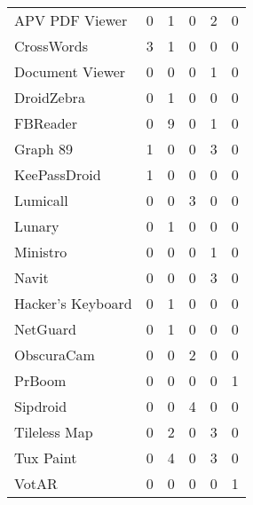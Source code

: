 \begin{table}[t]
\begin{tabular}{l||r|r|r|r|r}
    APV PDF Viewer    & 0 & 1 & 0 & \cellcolor{\succcolor}2 & 0 \\ 
    CrossWords        & \cellcolor{\succcolor}3 & 1 & 0 & 0 & 0 \\ 
    Document Viewer   & 0 & 0 & 0 & \cellcolor{\succcolor}1 & 0 \\ 
    DroidZebra        & 0 & 1 & 0 & 0 & 0 \\ 
    FBReader          & 0 & 9 & 0 & \cellcolor{\succcolor}1 & 0 \\ 
    Graph 89          & \cellcolor{\succcolor}1 & 0 & 0 & \cellcolor{\succcolor}3 & 0 \\ 
    KeePassDroid      & \cellcolor{\succcolor}1 & 0 & 0 & 0 & 0 \\
    Lumicall          & 0 & 0 & \cellcolor{\succcolor}3 & 0 & 0 \\ 
    Lunary            & 0 & 1 & 0 & 0 & 0 \\
    Ministro          & 0 & 0 & 0 & \cellcolor{\succcolor}1 & 0 \\ 
    Navit             & 0 & 0 & 0 & \cellcolor{\succcolor}3 & 0 \\ 
    Hacker's Keyboard & 0 & 1 & 0 & 0 & 0 \\ 
    NetGuard          & 0 & 1 & 0 & 0 & 0 \\ 
    ObscuraCam        & 0 & 0 & \cellcolor{\succcolor}2 & 0 & 0 \\ 
    PrBoom            & 0 & 0 & 0 & 0 & \cellcolor{\succcolor}1 \\
    Sipdroid          & 0 & 0 & \cellcolor{\succcolor}4 & 0 & 0 \\ 
    Tileless Map      & 0 & 2 & 0 & \cellcolor{\succcolor}3 & 0 \\ 
    Tux Paint         & 0 & 4 & 0 & \cellcolor{\succcolor}3 & 0 \\ 
    VotAR             & 0 & 0 & 0 & 0 & \cellcolor{\succcolor}1 \\
  \end{tabular}
\end{table}
